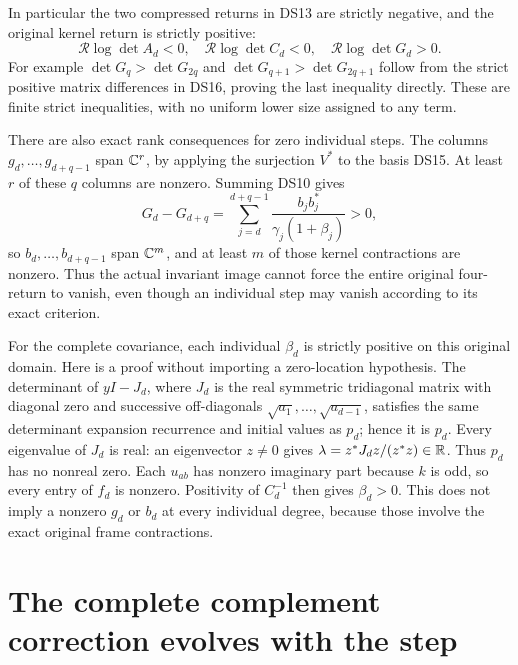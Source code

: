 \documentclass[11pt]{article}
\begin{document}
In particular the two compressed returns in DS13 are strictly negative,
and the original kernel return is strictly positive:
\begin{equation}\label{dsroot:eq:strictreturn}
\boxed{\mathcal R\log\det A_d<0,\quad
\mathcal R\log\det C_d<0,\quad
\mathcal R\log\det G_d>0.}
\tag{DS17}
\end{equation}
For example \(\det G_q>\det G_{2q}\) and
\(\det G_{q+1}>\det G_{2q+1}\) follow from the strict positive
matrix differences in DS16, proving the last inequality directly.
These are finite strict inequalities, with no uniform lower size
assigned to any term.

There are also exact rank consequences for zero individual steps.
The columns \(g_d,\ldots,g_{d+q-1}\) span \(\mathbb C^r\), by applying
the surjection \(V^*\) to the basis DS15. At least \(r\) of these
\(q\) columns are nonzero. Summing DS10 gives
\[
G_d-G_{d+q}=\sum_{j=d}^{d+q-1}
\frac{b_jb_j^*}{\gamma_j(1+\beta_j)}>0,
\]
so \(b_d,\ldots,b_{d+q-1}\) span \(\mathbb C^m\), and at least \(m\)
of those kernel contractions are nonzero. Thus the actual invariant
image cannot force the entire original four-return to vanish, even
though an individual step may vanish according to its exact criterion.

For the complete covariance, each individual \(\beta_d\) is strictly
positive on this original domain. Here is a proof without importing a
zero-location hypothesis. The determinant of \(yI-J_d\), where
\(J_d\) is the real symmetric tridiagonal matrix with diagonal zero
and successive off-diagonals \(\sqrt{a_1},\ldots,\sqrt{a_{d-1}}\),
satisfies the same determinant expansion recurrence and initial values
as \(p_d\); hence it is \(p_d\). Every eigenvalue of \(J_d\) is
real: an eigenvector \(z\ne0\) gives
\(\lambda=z^*J_dz/(z^*z)\in\mathbb R\). Thus \(p_d\) has no nonreal
zero. Each \(u_{ab}\) has nonzero imaginary part because \(k\) is
odd, so every entry of \(f_d\) is nonzero. Positivity of
\(C_d^{-1}\) then gives \(\beta_d>0\). This does not imply a
nonzero \(g_d\) or \(b_d\) at every individual degree, because those
involve the exact original frame contractions.

\section{The complete complement correction evolves with the step}
\end{document}
